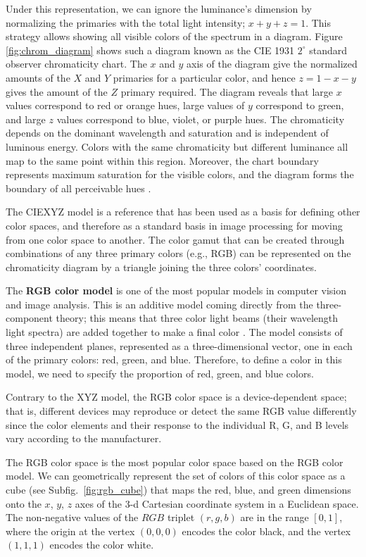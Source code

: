 Under this representation, we can ignore the luminance's dimension by normalizing the primaries with the total light intensity; $x+y+z=1$. This strategy allows showing all visible colors of the spectrum in a diagram. Figure \ref{fig:chrom_diagram} shows such a diagram known as the CIE 1931 $2^{\circ}$ standard observer chromaticity chart. The $x$ and $y$ axis of the diagram give the normalized amounts of the $X$ and $Y$ primaries for a particular color, and hence $z = 1 - x - y$ gives the amount of the $Z$ primary required. The diagram reveals that large $x$ values correspond to red or orange hues, large values of $y$ correspond to green, and large $z$ values correspond to blue, violet, or purple hues. The chromaticity depends on the dominant wavelength and saturation and is independent of luminous energy. Colors with the same chromaticity but different luminance all map to the same point within this region. Moreover, the chart boundary represents maximum saturation for the visible colors, and the diagram forms the boundary of all perceivable hues \citep{Bull:Book:2014}. 

The CIEXYZ model is a reference that has been used as a basis for defining other color spaces, and therefore as a standard basis in image processing for moving from one color space to another. The color gamut that can be created through combinations of any three primary colors (e.g., RGB) can be represented on the chromaticity diagram by a triangle joining the three colors' coordinates.

The \textbf{RGB color model} is one of the most popular models in computer vision and image analysis. This is an additive model coming directly from the three-component theory; this means that three color light beams (their wavelength light spectra) are added together to make a final color \citep{Gonzalez.Woods:Book:2008}. The model consists of three independent planes, represented as a three-dimensional vector, one in each of the primary colors: red, green, and blue. Therefore, to define a color in this model, we need to specify the proportion of red, green, and blue colors.

Contrary to the XYZ model, the RGB color space is a device-dependent space; that is, different devices may reproduce or detect the same RGB value differently since the color elements and their response to the individual R, G, and B levels vary according to the manufacturer.

The RGB color space is the most popular color space based on the RGB color model. We can geometrically represent the set of colors of this color space as a cube (see Subfig.\ \ref{fig:rgb_cube}) that maps the red, blue, and green dimensions onto the $x$, $y$, $z$ axes of the 3-d Cartesian coordinate system in a Euclidean space. The non-negative values of the $RGB$ triplet $(r,g,b)$ are in the range $[0,1]$, where the origin at the vertex $(0,0,0)$ encodes the color black, and the vertex $(1,1,1)$ encodes the color white. 

